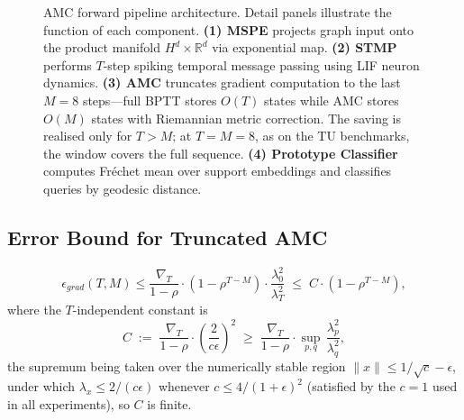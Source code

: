 \documentclass[a4paper,fleqn]{cas-dc}
\begin{document}
\begin{figure}[pos=htbp]
\caption{AMC forward pipeline architecture. Detail panels illustrate the function of each component. \textbf{(1) MSPE} projects graph input onto the product manifold $H^d{\times}\mathbb{R}^d$ via exponential map. \textbf{(2) STMP} performs $T$-step spiking temporal message passing using LIF neuron dynamics. \textbf{(3) AMC} truncates gradient computation to the last $M\!=\!8$ steps---full BPTT stores $O(T)$ states while AMC stores $O(M)$ states with Riemannian metric correction. The saving is realised only for $T > M$; at $T{=}M{=}8$, as on the TU benchmarks, the window covers the full sequence. \textbf{(4) Prototype Classifier} computes Fr\'echet mean over support embeddings and classifies queries by geodesic distance.}
\label{fig:architecture}
\end{figure}

\label{sec:theory}

\subsection{Error Bound for Truncated AMC}

\begin{equation}
\epsilon_{grad}(T, M) \leq \frac{\nabla_T}{1-\rho} \cdot \left(1 - \rho^{T-M}\right) \cdot \frac{\lambda_0^2}{\lambda_T^2}
\; \leq \; C \cdot \left(1 - \rho^{T-M}\right),
\label{eq:error_bound}
\end{equation}
where the $T$-independent constant is
\begin{equation}
C \;:=\; \frac{\nabla_T}{1-\rho} \cdot \left(\frac{2}{c\epsilon}\right)^{2}
\;\geq\; \frac{\nabla_T}{1-\rho} \cdot \sup_{p,q}\,\frac{\lambda_p^2}{\lambda_q^2},
\label{eq:constant_C}
\end{equation}
the supremum being taken over the numerically stable region $\|x\|\le 1/\sqrt{c}-\epsilon$, under which $\lambda_x\le 2/(c\epsilon)$ whenever $c\le 4/(1+\epsilon)^2$ (satisfied by the $c{=}1$ used in all experiments), so $C$ is finite.
\end{document}
